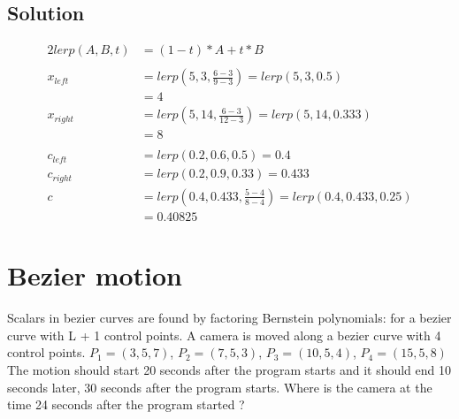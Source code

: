 \documentclass[12pt,fleqn,reqno]{article}
\begin{document}
\subsection{Solution}
\begin{alignat*}{2}
	lerp(A,B,t)	&= (1 - t) * A + t * B\\
	\\
	x_{left}	&= lerp(5, 3, \frac{6-3}{9-3} )= lerp(5, 3, 0.5)\\
			&= 4\\
	x_{right}	&= lerp(5, 14, \frac{6-3}{12-3} )= lerp(5, 14, 0.333)\\
			&= 8\\
	\\
	c_{left}	&= lerp(0.2, 0.6, 0.5 ) = 0.4\\
	c_{right}	&= lerp(0.2, 0.9, 0.33 ) = 0.433\\
	c		&= lerp(0.4, 0.433, \frac{5-4}{8-4}) = lerp(0.4, 0.433, 0.25)\\
			&= 0.40825
\end{alignat*}

\section{Bezier motion}
Scalars in bezier curves are found by factoring Bernstein polynomials:
for a bezier curve with L + 1 control points. A camera is moved along a bezier curve with 4 control points.
\(P_1 = (3, 5, 7)\), \(P_2 = (7, 5, 3)\), \(P_3 = (10, 5, 4)\), \(P_4 = (15, 5, 8)\)
The motion should start 20 seconds after the program starts and it should end 10 seconds later, 30 seconds after the program starts.
Where is the camera at the time 24 seconds after the program started ?
\end{document}
